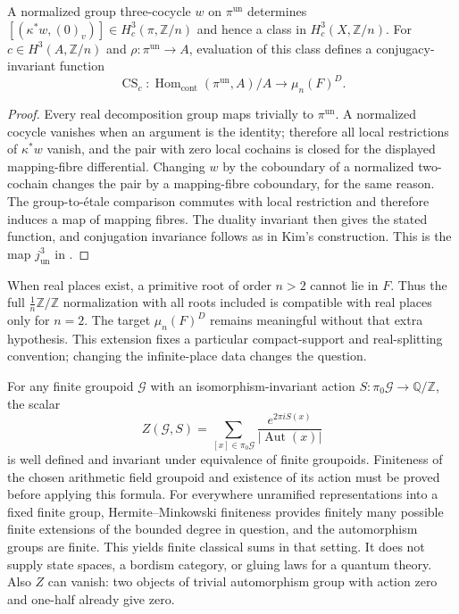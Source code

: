 \begin{proposition}
\label{syn-arith:real-cs}
A normalized group three-cocycle $w$ on $\pi^{\mathrm{un}}$ determines
$[(\kappa^*w,(0)_v)]\in H_c^3(\pi,\mathbb Z/n)$ and hence a class in
$H_c^3(X,\mathbb Z/n)$.  For $c\in H^3(A,\mathbb Z/n)$ and
$\rho:\pi^{\mathrm{un}}\to A$, evaluation of this class defines a
conjugacy-invariant function
\[
 \operatorname{CS}_c:\operatorname{Hom}_{\mathrm{cont}}(\pi^{\mathrm{un}},A)/A
          \longrightarrow\mu_n(F)^D.
\]
\end{proposition}
\begin{proof}
Every real decomposition group maps trivially to $\pi^{\mathrm{un}}$.
A normalized cocycle vanishes when an argument is the identity; therefore
all local restrictions of $\kappa^*w$ vanish, and the pair with zero local
cochains is closed for the displayed mapping-fibre differential.
Changing $w$ by the coboundary of a normalized two-cochain changes the pair
by a mapping-fibre coboundary, for the same reason.
The group-to-\'etale comparison commutes with local restriction and therefore
induces a map of mapping fibres.
The duality invariant then gives the stated function, and conjugation
invariance follows as in Kim's construction.
This is the map $j^3_{\mathrm{un}}$ in
\cite[\S2.3, equation~(2)]{syn-arith:LeePark}.
\end{proof}

When real places exist, a primitive root of order $n>2$ cannot lie in $F$.
Thus the full $\tfrac1n\mathbb Z/\mathbb Z$ normalization with all roots
included is compatible with real places only for $n=2$.
The target $\mu_n(F)^D$ remains meaningful without that extra hypothesis.
This extension fixes a particular compact-support and real-splitting
convention; changing the infinite-place data changes the question.

For any finite groupoid $\mathcal G$ with an isomorphism-invariant action
$S:\pi_0\mathcal G\to\mathbb Q/\mathbb Z$, the scalar
\[
 Z(\mathcal G,S)=\sum_{[x]\in\pi_0\mathcal G}
             \frac{e^{2\pi iS(x)}}{|\operatorname{Aut}(x)|}
\]
is well defined and invariant under equivalence of finite groupoids.
Finiteness of the chosen arithmetic field groupoid and existence of its
action must be proved before applying this formula.
For everywhere unramified representations into a fixed finite group,
Hermite--Minkowski finiteness provides finitely many possible finite
extensions of the bounded degree in question, and the automorphism groups
are finite.  This yields finite classical sums in that setting.
It does not supply state spaces, a bordism category, or gluing laws for a
quantum theory.  Also $Z$ can vanish: two objects of trivial automorphism
group with action zero and one-half already give zero.

